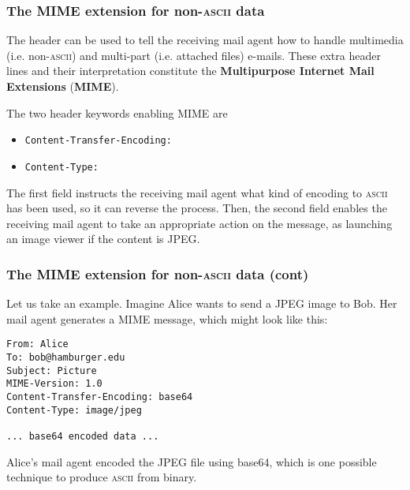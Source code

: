 %
\begin{frame}[containsverbatim]
\frametitle{The MIME extension for non-\textsc{ascii} data}

The header can be used to tell the receiving mail agent how to handle
multimedia (i.e. non-\textsc{ascii}) and multi-part (i.e. attached
files) e-mails. These extra header lines and their interpretation
constitute the \textbf{Multipurpose Internet Mail Extensions}
(\textbf{MIME}).

The two header keywords enabling MIME are 
\begin{itemize}

  \item {\small \verb+Content-Transfer-Encoding:+}

  \item {\small \verb+Content-Type:+}

\end{itemize}
The first field instructs the receiving mail agent what kind of
encoding to \textsc{ascii} has been used, so it can reverse the
process. Then, the second field enables the receiving mail agent to
take an appropriate action on the message, as launching an image
viewer if the content is JPEG.

\end{frame}

%
\begin{frame}[containsverbatim]
\frametitle{The MIME extension for non-\textsc{ascii} data (cont)}

Let us take an example. Imagine Alice wants to send a JPEG image to
Bob. Her mail agent generates a MIME message, which might look like
this:
{\small
\begin{verbatim}
From: Alice
To: bob@hamburger.edu
Subject: Picture
MIME-Version: 1.0
Content-Transfer-Encoding: base64
Content-Type: image/jpeg

... base64 encoded data ...
\end{verbatim}
}
Alice's mail agent encoded the JPEG file using base64, which is one
possible technique to produce \textsc{ascii} from binary.

\end{frame}

